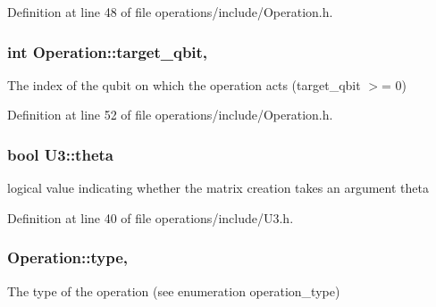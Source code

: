 Definition at line 48 of file operations/include/\+Operation.\+h.

\subsubsection[{\texorpdfstring{target\+\_\+qbit}{target_qbit}}]{\setlength{\rightskip}{0pt plus 5cm}int Operation\+::target\+\_\+qbit\hspace{0.3cm}{\ttfamily [protected]}, {\ttfamily [inherited]}}\hypertarget{class_operation_a3e489b72c124b494777c71b1646bb1e9}{}\label{class_operation_a3e489b72c124b494777c71b1646bb1e9}


The index of the qubit on which the operation acts (target\+\_\+qbit $>$= 0) 



Definition at line 52 of file operations/include/\+Operation.\+h.

\subsubsection[{\texorpdfstring{theta}{theta}}]{\setlength{\rightskip}{0pt plus 5cm}bool U3\+::theta\hspace{0.3cm}{\ttfamily [protected]}}\hypertarget{class_u3_a2e53d6f8d744e64377408866bfa6c473}{}\label{class_u3_a2e53d6f8d744e64377408866bfa6c473}


logical value indicating whether the matrix creation takes an argument theta 



Definition at line 40 of file operations/include/\+U3.\+h.

\subsubsection[{\texorpdfstring{type}{type}}]{ Operation\+::type\hspace{0.3cm}{\ttfamily [protected]}, {\ttfamily [inherited]}}\hypertarget{class_operation_ad47c56c86d62a4c775571e1600416479}{}\label{class_operation_ad47c56c86d62a4c775571e1600416479}


The type of the operation (see enumeration operation\+\_\+type) 



